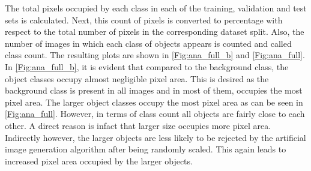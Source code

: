 		The total pixels occupied by each class in each of the training, validation and test sets is calculated. Next, this count of pixels is converted to percentage with respect to the total number of pixels in the corresponding dataset split. Also, the number of images in which each class of objects appears is counted and called class count. The resulting plots are shown in \ref{Fig:ana_full_b} and \ref{Fig:ana_full}. In \ref{Fig:ana_full_b}, it is evident that compared to the background class, the object classes occupy almost negligible pixel area. This is desired as the background class is present in all images and in most of them, occupies the most pixel area. The larger object classes occupy the most pixel area as can be seen in \ref{Fig:ana_full}. However, in terms of class count all objects are fairly close to each other. A direct reason is infact that larger size occupies more pixel area. Indirectly however, the larger objects are less likely to be rejected by the artificial image generation algorithm after being randomly scaled. This again leads to increased pixel area occupied by the larger objects.
			

